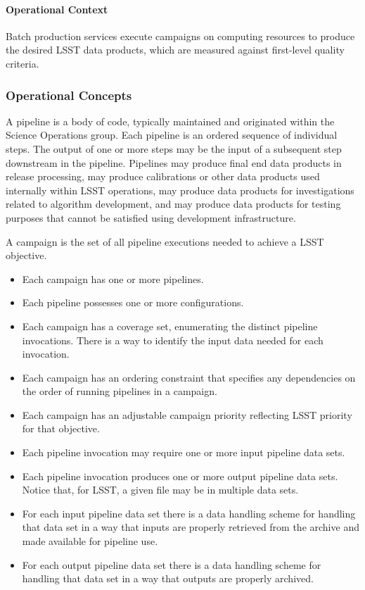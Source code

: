 \paragraph{Operational Context}
Batch production services execute campaigns on computing resources to produce 
the desired LSST data products, which are measured against first-level quality 
criteria. 

\subsubsection{Operational Concepts}
A pipeline is a body of code, typically maintained and originated within the 
Science Operations group. Each pipeline is an ordered sequence of individual 
steps. The output of one or more steps may be the input of a subsequent step 
downstream in the pipeline. Pipelines may produce final end data products in 
release processing, may produce calibrations or other data products used 
internally within LSST operations, may produce data products for investigations 
related to algorithm development, and may produce data products for testing 
purposes that cannot be satisfied using development infrastructure.

A campaign is the set of all pipeline executions needed to achieve a LSST 
objective.

\begin{itemize}

\item Each campaign has one or more pipelines.

\item Each pipeline possesses one or more configurations.

\item Each campaign has a coverage set, enumerating the distinct pipeline 
invocations. There is a way to identify the input data needed for each 
invocation.

\item Each campaign has an ordering constraint that specifies any dependencies 
on the order of running pipelines in a campaign.

\item Each campaign has an adjustable campaign priority reflecting LSST priority 
for that objective.

\item Each pipeline invocation may require one or more input pipeline data sets. 

\item Each pipeline invocation produces one or more output pipeline data sets. 
Notice that, for LSST, a given file may be in multiple data sets.  

\item For each input pipeline data set there is a data handling scheme for 
handling that data set in a 
way that inputs are properly retrieved from the archive and made available for 
pipeline use.

\item For each output pipeline data set there is a data handling scheme for 
handling that data set in a way that outputs are properly archived.

\end{itemize}

